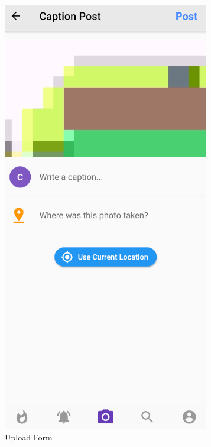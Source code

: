 \begin{figure}[!htb]
    \centering
    \includegraphics[scale=0.80]{AppScreenShots/caption post.PNG}
    \caption{Upload Form}
    \label{fig:Upload Form}
\end{figure}

